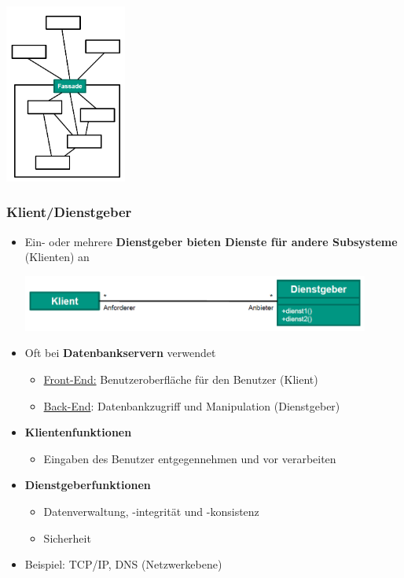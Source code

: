 \begin{center}
\includegraphics[width=0.3\textwidth]{../images/fassadeSchichtenarchitektur.png}
\end{center}
				
\subsubsection{Klient/Dienstgeber}
				
\begin{itemize}
\item Ein- oder mehrere \textbf{Dienstgeber bieten Dienste für andere Subsysteme} (Klienten) an
\begin{center}
\includegraphics[width=0.9\textwidth]{../images/klientDienstgeber.png}
\end{center}
\item Oft bei \textbf{Datenbankservern} verwendet
\begin{itemize}
\item \underline{Front-End:} Benutzeroberfläche für den Benutzer (Klient)
\item \underline{Back-End}: Datenbankzugriff und Manipulation (Dienstgeber)
\end{itemize}
\item \textbf{Klientenfunktionen}
\begin{itemize}
\item Eingaben des Benutzer entgegennehmen und vor verarbeiten
\end{itemize}
\item \textbf{Dienstgeberfunktionen}
\begin{itemize}
\item Datenverwaltung, -integrität und -konsistenz
\item Sicherheit
\end{itemize}		
\item Beispiel: TCP/IP, DNS (Netzwerkebene)		
\end{itemize}	
	
